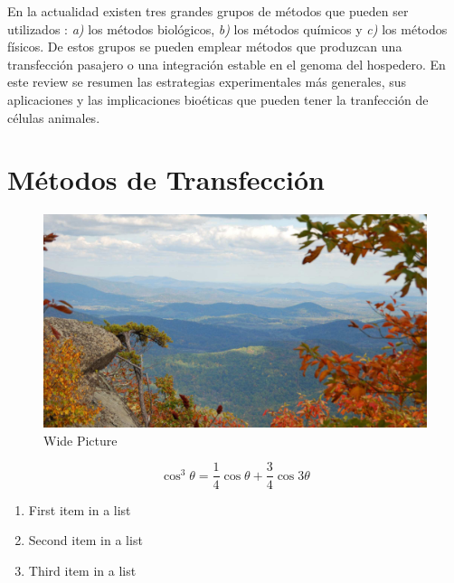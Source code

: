 \documentclass[fleqn,10pt]{SelfArx} %
\begin{document}
En la actualidad existen tres grandes grupos de métodos que pueden ser utilizados \cite{Kim:2010aa}: \textit{a)} los métodos biológicos, \textit{b)} los métodos químicos y \textit{c)} los métodos físicos. De estos grupos se pueden emplear métodos que produzcan una transfección pasajero o una integración estable en el genoma del hospedero. En este review se resumen las estrategias experimentales más generales, sus aplicaciones y las implicaciones bioéticas que pueden tener la tranfección de células animales.


\section{Métodos de Transfección}

\begin{figure}[ht]\centering %
\includegraphics[width=\linewidth]{images/view}
\caption{Wide Picture}
\label{fig:view}
\end{figure}


\begin{equation}
\cos^3 \theta =\frac{1}{4}\cos\theta+\frac{3}{4}\cos 3\theta
\label{eq:refname2}
\end{equation}



\begin{enumerate}[noitemsep] %
\item First item in a list
\item Second item in a list
\item Third item in a list
\end{enumerate}
\end{document}
